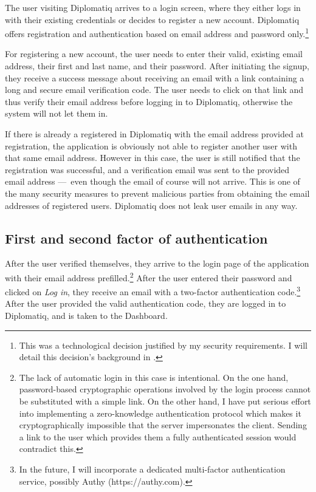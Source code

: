 The user visiting Diplomatiq arrives to a login screen, where they either logs in with their existing credentials or decides to register a new account. Diplomatiq offers registration and authentication based on email address and password only.\footnote{This was a technological decision justified by my security requirements. I will detail this decision's background in .}

For registering a new account, the user needs to enter their valid, existing email address, their first and last name, and their password. After initiating the signup, they receive a success message about receiving an email with a link containing a long and secure email verification code. The user needs to click on that link and thus verify their email address before logging in to Diplomatiq, otherwise the system will not let them in.

If there is already a registered in Diplomatiq with the email address provided at registration, the application is obviously not able to register another user with that same email address. However in this case, the user is still notified that the registration was successful, and a verification email was sent to the provided email address — even though the email of course will not arrive. This is one of the many security measures to prevent malicious parties from obtaining the email addresses of registered users. Diplomatiq does not leak user emails in any way.

\subsection{First and second factor of authentication}

After the user verified themselves, they arrive to the login page of the application with their email address prefilled.\footnote{The lack of automatic login in this case is intentional. On the one hand, password-based cryptographic operations involved by the login process cannot be substituted with a simple link. On the other hand, I have put serious effort into implementing a zero-knowledge authentication protocol which makes it cryptographically impossible that the server impersonates the client. Sending a link to the user which provides them a fully authenticated session would contradict this.} After the user entered their password and clicked on \emph{Log in}, they receive an email with a two-factor authentication code.\footnote{In the future, I will incorporate a dedicated multi-factor authentication service, possibly Authy (https://authy.com).} After the user provided the valid authentication code, they are logged in to Diplomatiq, and is taken to the Dashboard.

